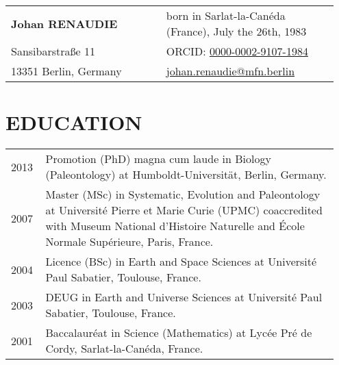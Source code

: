 \documentclass[11pt, a4paper]{article}
\begin{document}
\begin{longtable}{p{0.45\linewidth} >{\raggedleft\arraybackslash}p{0.5\linewidth}}
{\bfseries \Large Johan RENAUDIE} & born in Sarlat-la-Can\'{e}da (France), July the 26th, 1983 \\
Sansibarstra\ss e 11  & ORCID: \href{http://orcid.org/0000-0002-9107-1984}{0000-0002-9107-1984}\\
13351 Berlin, Germany & \href{mailto:johan.renaudie@mfn.berlin}{johan.renaudie@mfn.berlin}\\
\hline
\end{longtable}
\section{EDUCATION}
\begin{longtable}{p{0.1\linewidth} P{0.85\linewidth}}

2013 & Promotion (PhD) magna cum laude in Biology (Paleontology) at Humboldt-Universit\"{a}t, Berlin, Germany.\\
2007 & Master (MSc) in Systematic, Evolution and Paleontology at Universit\'{e} Pierre et Marie Curie (UPMC) coaccredited with Museum National d'Histoire Naturelle and \'{E}cole Normale Sup\'{e}rieure, Paris, France.\\
2004 & Licence (BSc) in Earth and Space Sciences at Universit\'{e} Paul Sabatier, Toulouse, France.\\
2003 & DEUG in Earth and Universe Sciences at Universit\'{e} Paul Sabatier, Toulouse, France.\\
2001 & Baccalaur\'{e}at in Science (Mathematics) at Lyc\'{e}e Pr\'{e} de Cordy, Sarlat-la-Can\'{e}da, France.\\
\end{longtable}
\end{document}
